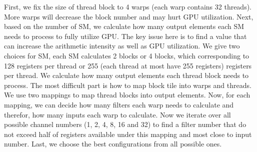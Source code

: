 First, we fix the size of thread block to 4 warps (each warp contains 32 threads). More warps will decrease the block number and may hurt GPU utilization. 
Next, based on the number of SM, we calculate how many output elements each SM needs to process to fully utilize GPU.
The key issue here is to find a value that can increase the arithmetic intensity as well as GPU utilization. 
We give two choices for SM, each SM calculates 2 blocks or 4 blocks, which corresponding to 128 registers per thread or 255 (each thread at most have 255 registers) registers per thread.
We calculate how many output elements each thread block needs to process.
The most difficult part is how to map block tile into warps and threads.
We use two mappings to map thread blocks into output elements.
Now, for each mapping, we can decide how many filters each warp needs to calculate and therefor, how many inputs each warp to calculate.
Now we iterate over all possible channel numbers (1, 2, 4, 8, 16 and 32) to find a filter number that do not exceed half of registers available under this mapping and most close to input number.
Last, we choose the best configurations from all possible ones.
